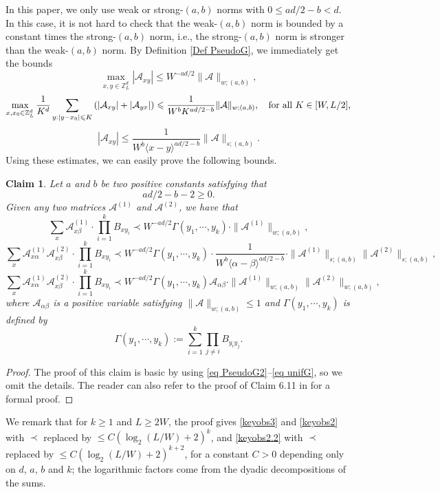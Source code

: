 \documentclass{article}
\newcommand{\1}{\mathds{1}}
\numberwithin{equation}{section}
\newcommand{\al}{\alpha}
\newcommand{\be}{\begin{equation}}
\newcommand{\ee}{\end{equation}}
\renewcommand{\cal}{\mathcal}
\renewcommand{\leq}{\leqslant}
\renewcommand{\geq}{\geqslant}
\renewcommand{\le}{\leq}
\renewcommand{\ge}{\geq}
\newcommand{\Z}{\mathbb{Z}}
\theoremstyle{plain} %
\newtheorem{claim}[theorem]{Claim}
\theoremstyle{remark}
\begin{document}
In this paper, we only use weak or strong-$(a,b)$ norms with $0\le ad/2-b<d$. In this case, it is not hard to check that the weak-$(a,b)$ norm is bounded by a constant times the strong-$(a,b)$ norm, i.e., the strong-$(a,b)$ norm is stronger than the weak-$(a,b)$ norm. By Definition \ref{Def PseudoG}, we immediately get the bounds
\be\label{eq PseudoG2} 
\max_{x,y\in \Z_L^d} \left|\cal A_{xy}\right| \le W^{-a d/2}\|\cal A\|_{w;(a,b)},
\ee
\be\label{eq PseudoG}
\max_{x, x_0\in \Z_L^d} \frac1{ K^{d}}\sum_{y:| y - x_0 |\le K} \left(\left|\cal A_{xy}\right|+\left| \cal A_{yx}\right| \right)\le   \frac{1}{W^b K^{ad/2-b}}  \|\cal A\|_{w;(a,b)},\quad \text{for all $  K \in [W, L/2]$,}
\ee
\be\label{eq unifG}
\left|\cal A_{xy}\right| \le    \frac{1}{W^b \langle x-y\rangle^{ad/2-b}} \|\cal A\|_{s;(a,b)}.
\ee
Using these estimates, we can easily prove the following bounds.


\begin{claim}\label{claim_basic}
Let $a$ and $b$ be two positive constants satisfying that  
	\be\label{a+b}
	a d/2 - b - 2\ge 0.
	\ee
Given any two matrices $\cal A^{(1)}$ and $\cal A^{(2)}$, we have that 
\be\label{keyobs3}
\sum_{x}\cal A^{(1)}_{x \beta} \cdot \prod_{i=1}^k B_{x y_i} \prec W^{-ad/2 } \Gamma(y_1,\cdots, y_k) \cdot \|\cal A^{(1)}\|_{w;(a,b)},
\ee
\be\label{keyobs2.2}
\sum_{x} \cal A^{(1)}_{x \al}\cal A^{(2)} _{x \beta} \cdot \prod_{i=1}^k B_{x y_i} \prec W^{-a d/2 }\Gamma(y_1,\cdots, y_k) \cdot \frac{1}{W^b\langle \al-\beta\rangle^{ad/2-b}} \cdot \|\cal A^{(1)}\|_{s; (a,b)}\|\cal A^{(2)}\|_{s; (a,b)},
\ee
\be\label{keyobs2}
\sum_{x} \cal A^{(1)}_{x \al}\cal A^{(2)} _{x \beta} \cdot  \prod_{i=1}^k B_{x y_i} \prec W^{-a d/2 }\Gamma(y_1,\cdots, y_k)  {\cal A}_{\al\beta} \cdot \|\cal A^{(1)}\|_{w; (a,b)}\|\cal A^{(2)}\|_{w; (a,b)},
\ee
where $ {\cal A}_{\al\beta}$ is a positive variable satisfying $\|\cal A\|_{w;(a,b)}\le 1$ and $\Gamma(y_1,\cdots, y_k)$ is defined by 
\be\label{defn_Gamma}\Gamma(y_1,\cdots, y_k):= \sum_{i=1}^k \prod_{j\ne i}B_{y_{i}y_j}.\ee
\end{claim}
\begin{proof}
The proof of this claim is basic by using \eqref{eq PseudoG2}--\eqref{eq unifG}, so we omit the details. The reader can also refer to the proof of Claim 6.11 in \cite{PartI_high} for a formal proof.
\end{proof}
We remark that for $k\ge 1$ and $L\ge 2W$, the proof gives \eqref{keyobs3} and \eqref{keyobs2} with $\prec$ replaced by $\le C(\log_2(L/W)+2)^k$, and \eqref{keyobs2.2} with $\prec$ replaced by $\le C(\log_2(L/W)+2)^{k+2}$, for a constant $C>0$ depending only on $d$, $a$, $b$ and $k$; the logarithmic factors come from the dyadic decompositions of the sums.
\end{document}

